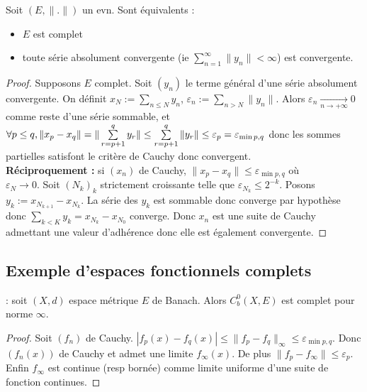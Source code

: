 \begin{lemme} 

Soit $(E,\|.\|)$ un evn. Sont équivalents :
    \begin{itemize}
        \item $E$ est complet
        \item toute série absolument convergente (ie $\sum\limits_{n=1}^{\infty} \|y_n\|<\infty $) est convergente.
    \end{itemize}
\end{lemme}
\begin{proof}
    Supposons $E$ complet. Soit $(y_n)$ le terme général d'une série absolument convergente. 
    On définit $x_N:=\sum\limits_{n\le N}^{} y_n$, $\varepsilon _n:=\sum\limits_{n>N}^{} \|y_n\|$. 
    Alors $\varepsilon _n \underset{n\to +\infty}{\longrightarrow} 0$ comme reste d'une série sommable, et $\forall p\le q,\ \\
    \|x_p-x_q\|=\|\sum\limits_{r=p+1}^{q} y_r\|\le \sum\limits_{r=p+1}^{q} \|y_r\|\le \varepsilon _p = \varepsilon_{\min p,q} $ donc les sommes partielles satisfont le critère de Cauchy donc convergent.\\
    
    \textbf{Réciproquement :} si $(x_{n})$ de Cauchy, $\|x_p-x_q\|\le \varepsilon _{\min p,q}$ où \\
    $\varepsilon _N\to 0$. Soit $(N_k)_k$ strictement croissante telle que $\varepsilon _{N_k}\le 2^{-k}$. Posons $y_k:=x_{N_{k+1}}-x_{N_k}$.
    La série des $y_k$ est sommable donc converge par hypothèse donc $\sum\limits_{k<K}^{} y_k=x_{N_k}-x_{N_0}$ converge. Donc $x_{n}$ est une suite de Cauchy admettant une valeur d'adhérence donc elle est également convergente.
\end{proof}


\subsection{Exemple d'espaces fonctionnels complets}
\begin{ex} : soit $(X,d)$ espace métrique $E$ de Banach. Alors $C^0_b(X,E)$ est complet pour norme $\infty $.
\end{ex}
\begin{proof}
    Soit $(f_n)$ de Cauchy. $|f_p(x)-f_q(x)|\le \|f_p-f_q\|_\infty \le \varepsilon _{\min p,q}$. Donc $(f_n(x))$ de Cauchy et admet une limite $f_\infty (x)$. De plus $\|f_p-f_\infty \|\le \varepsilon _p$. Enfin $f_\infty $ est continue (resp bornée) comme limite uniforme d'une suite de fonction continues.
\end{proof}

